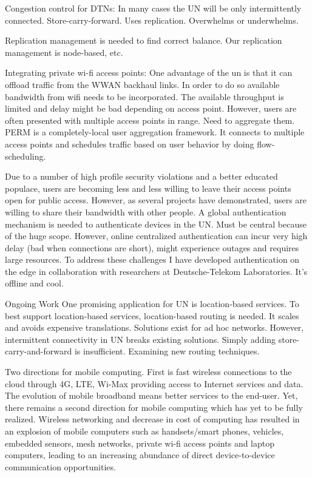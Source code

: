 \documentclass[10pt]{article}
\begin{document}
Congestion control for DTNs:
In many cases the UN will be only intermittently connected.
Store-carry-forward.  Uses replication.  Overwhelms or underwhelms.

Replication management is needed to find correct balance.  Our replication
management is node-based, etc.


Integrating private wi-fi access points:
One advantage of the un is that it can offload traffic from the WWAN backhaul
links.  In order to do so available bandwidth from wifi needs to be
incorporated.  
The available throughput is limited and delay might be bad depending on access
point.
However, users are often presented with multiple access points in range.
Need to aggregate them.  PERM is a completely-local user aggregation framework.
It connects to multiple access points and schedules traffic based on user
behavior by doing flow-scheduling.

Due to a number of high profile security violations and a better educated
populace, users are becoming less and less willing to leave their access points
open for public access.  However, as several projects have demonstrated, users
are willing to share their bandwidth with other people.  A global authentication
mechanism is needed to authenticate devices in the UN.  Must be central because
of the huge scope.  However, online centralized authentication can incur very
high delay (bad when connections are short), might experience outages and
requires large resources.  To address these challenges I have developed
authentication on the edge in collaboration with researchers at Deutsche-Telekom
Laboratories.
It's offline and cool.


Ongoing Work
One promising application for UN is location-based services.  To best support
location-based services, location-based routing is needed.  It scales and avoids
expensive translations.  Solutions exist for ad hoc networks.  However,
intermittent connectivity in UN breaks existing solutions.  Simply adding
store-carry-and-forward is insufficient.  Examining new routing techniques.





Two directions for mobile computing.  First is fast wireless connections to the
cloud through 4G, LTE, Wi-Max providing access to Internet services and data.
The evolution of mobile broadband means better services to the end-user.  Yet,
there remains a second direction for mobile computing which has yet to be fully
realized.  
Wireless networking and decrease in cost of computing has resulted in an
explosion of mobile computers such as handsets/smart phones, vehicles, embedded
sensors, mesh networks, private wi-fi access points and laptop computers,
leading to an increasing abundance of direct
device-to-device communication opportunities.
\end{document}
